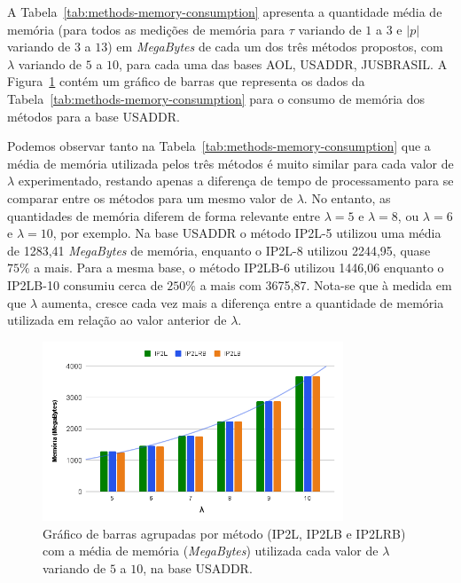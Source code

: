 A Tabela~\ref{tab:methods-memory-consumption} apresenta a quantidade média de memória (para todos as medições de memória para $\tau$ variando de $1$ a $3$ e $|p|$ variando de $3$ a $13$) em \textit{MegaBytes} de cada um dos três métodos propostos, com $\lambda$ variando de $5$ a $10$, para cada uma das bases AOL, USADDR, JUSBRASIL. A Figura~\ref{fig:memory_consumption_usaddr} contém um gráfico de barras que representa os dados da Tabela~\ref{tab:methods-memory-consumption} para o consumo de memória dos métodos para a base USADDR.

Podemos observar tanto na Tabela~\ref{tab:methods-memory-consumption} que a média de memória utilizada pelos três métodos é muito similar para cada valor de $\lambda$ experimentado, restando apenas a diferença de tempo de processamento para se comparar entre os métodos para um mesmo valor de $\lambda$. No entanto, as quantidades de memória diferem de forma relevante entre $\lambda=5$ e $\lambda=8$, ou $\lambda=6$ e $\lambda=10$, por exemplo. Na base USADDR o método IP2L-5 utilizou uma média de 1283,41 \textit{MegaBytes} de memória, enquanto o IP2L-8 utilizou 2244,95, quase $75\%$ a mais. Para a mesma base, o método IP2LB-6 utilizou 1446,06 enquanto o IP2LB-10 consumiu cerca de $250\%$ a mais com 3675,87. Nota-se que à medida em que $\lambda$ aumenta, cresce cada vez mais a diferença entre a quantidade de memória utilizada em relação ao valor anterior de $\lambda$. 

\begin{figure} [h]
    \centering
    \includegraphics[width=0.80\textwidth]{figures/memory_usaddr.png}
    \caption{Gráfico de barras agrupadas por método (IP2L, IP2LB e IP2LRB) com a média de memória (\textit{MegaBytes}) utilizada cada valor de $\lambda$ variando de $5$ a $10$, na base USADDR.}
    \label{fig:memory_consumption_usaddr}
\end{figure}

